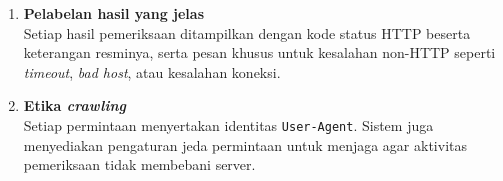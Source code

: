 \begin{enumerate}
    \item \textbf{Pelabelan hasil yang jelas}\\
    Setiap hasil pemeriksaan ditampilkan dengan kode status HTTP beserta keterangan resminya, serta pesan khusus untuk kesalahan non-HTTP seperti \textit{timeout}, \textit{bad host}, atau kesalahan koneksi.

    \item \textbf{Etika \textit{crawling}}\\
    Setiap permintaan menyertakan identitas \texttt{User-Agent}. Sistem juga menyediakan pengaturan jeda permintaan untuk menjaga agar aktivitas pemeriksaan tidak membebani server.

\end{enumerate}
